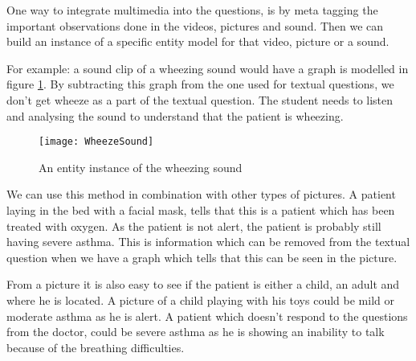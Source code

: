One way to integrate multimedia into the questions, is by meta tagging the important observations done in the videos, pictures and sound. Then we can build an instance of a specific entity model for that video, picture or a sound.

For example: a sound clip of a wheezing sound would have a graph is modelled in figure \ref{fig:WheezeSound}. By subtracting this graph from the one used for textual questions, we don't get wheeze as a part of the textual question. The student needs to listen and analysing the sound to understand that the patient is wheezing.

\begin{figure}[h!]
	\texttt{[image: WheezeSound]}
	\caption {An entity instance of the wheezing sound}
	\label{fig:WheezeSound}
\end{figure}

We can use this method in combination with other types of pictures. A patient laying in the bed with a facial mask, tells that this is a patient which has been treated with oxygen. As the patient is not alert, the patient is probably still having severe asthma. This is information which can be removed from the textual question when we have a graph which tells that this can be seen in the picture.

From a picture it is also easy to see if the patient is either a child, an adult and where he is located. A picture of a child playing with his toys could be mild or moderate asthma as he is alert. A patient which doesn't respond to the questions from the doctor, could be severe asthma as he is showing an inability to talk because of the breathing difficulties.


